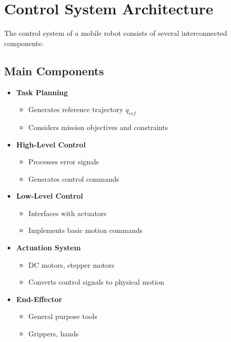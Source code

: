 \documentclass[openany]{book}
\theoremstyle{definition}
\theoremstyle{remark}
\begin{document}
\section{Control System Architecture}

The control system of a mobile robot consists of several interconnected components:

\subsection{Main Components}

\begin{itemize}
    \item \textbf{Task Planning}
        \begin{itemize}
            \item Generates reference trajectory $q_{ref}$
            \item Considers mission objectives and constraints
        \end{itemize}
        
    \item \textbf{High-Level Control}
        \begin{itemize}
            \item Processes error signals
            \item Generates control commands
        \end{itemize}
        
    \item \textbf{Low-Level Control}
        \begin{itemize}
            \item Interfaces with actuators
            \item Implements basic motion commands
        \end{itemize}
        
    \item \textbf{Actuation System}
        \begin{itemize}
            \item DC motors, stepper motors
            \item Converts control signals to physical motion
        \end{itemize}
        
    \item \textbf{End-Effector}
        \begin{itemize}
            \item General purpose tools
            \item Grippers, hands
        \end{itemize}
\end{itemize}
\end{document}
